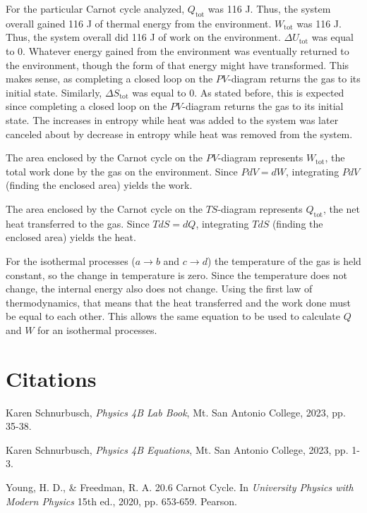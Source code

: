\documentclass[12pt]{iopart} %
\begin{document}
For the particular Carnot cycle analyzed, $Q_{\mathrm{tot}}$ was 116 J.
Thus, the system overall gained 116 J of thermal energy from the environment.
$W_{\mathrm{tot}}$ was 116 J.
Thus, the system overall did 116 J of work on the environment.
$\Delta U_{\mathrm{tot}}$ was equal to 0.
Whatever energy gained from the environment was eventually returned to the environment, though the form of that energy might have transformed.
This makes sense, as completing a closed loop on the $PV$-diagram returns the gas to its initial state.
Similarly, $\Delta S_{\mathrm{tot}}$ was equal to 0.
As stated before, this is expected since completing a closed loop on the $PV$-diagram returns the gas to its initial state.
The increases in entropy while heat was added to the system was later canceled about by decrease in entropy while heat was removed from the system.

The area enclosed by the Carnot cycle on the $PV$-diagram represents $W_{\mathrm{tot}}$, the total work done by the gas on the environment.
Since $P dV = dW$, integrating $P dV$ (finding the enclosed area) yields the work.

The area enclosed by the Carnot cycle on the $TS$-diagram represents $Q_{\mathrm{tot}}$, the net heat transferred to the gas.
Since $T dS = dQ$, integrating $T dS$ (finding the enclosed area) yields the heat.

For the isothermal processes ($a \to b$ and $c \to d$) the temperature of the gas is held constant, so the change in temperature is zero.
Since the temperature does not change, the internal energy also does not change.
Using the first law of thermodynamics, that means that the heat transferred and the work done must be equal to each other.
This allows the same equation to be used to calculate $Q$ and $W$ for an isothermal processes.

\section{Citations}

\begin{thebibliography}{9}

  Karen Schnurbusch,
  \textit{Physics 4B Lab Book},
  Mt. San Antonio College,
  2023,
  pp. 35-38.

  Karen Schnurbusch,
  \textit{Physics 4B Equations},
  Mt. San Antonio College,
  2023,
  pp. 1-3.

  Young, H. D., \& Freedman, R. A.
  20.6 Carnot Cycle. In \textit{University Physics with Modern Physics} 15th ed.,
  2020,
  pp. 653-659.
  Pearson. 

\end{thebibliography}
\end{document}
